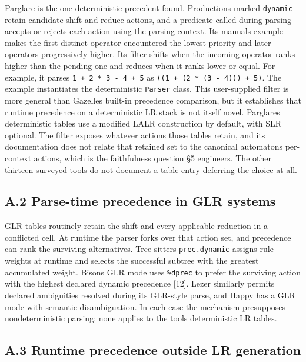 \documentclass[
  10pt,
]{article}
\begin{document}
Parglare is the one deterministic precedent found. Productions marked
\texttt{dynamic} retain candidate shift and reduce actions, and a
predicate called during parsing accepts or rejects each action using the
parsing context. Its manual\textquotesingle s example makes the first
distinct operator encountered the lowest priority and later operators
progressively higher. Its filter shifts when the incoming operator ranks
higher than the pending one and reduces when it ranks lower or equal.
For example, it parses \texttt{1\ +\ 2\ *\ 3\ -\ 4\ +\ 5} as
\texttt{((1\ +\ (2\ *\ (3\ -\ 4)))\ +\ 5)}. The example instantiates the
deterministic \texttt{Parser} class. This user-supplied filter is more
general than Gazelle\textquotesingle s built-in precedence comparison,
but it establishes that runtime precedence on a deterministic LR stack
is not itself novel. Parglare\textquotesingle s deterministic tables use
a modified LALR construction by default, with SLR optional. The filter
exposes whatever actions those tables retain, and its documentation does
not relate that retained set to the canonical
automaton\textquotesingle s per-context actions, which is the
faithfulness question §5 engineers. The other thirteen surveyed tools do
not document a table entry deferring the choice at all.

\hypertarget{a2-parse-time-precedence-in-glr-systems}{%
\subsection{A.2 Parse-time precedence in GLR
systems}\label{a2-parse-time-precedence-in-glr-systems}}

GLR tables routinely retain the shift and every applicable reduction in
a conflicted cell. At runtime the parser forks over that action set, and
precedence can rank the surviving alternatives.
Tree-sitter\textquotesingle s \texttt{prec.dynamic} assigns rule weights
at runtime and selects the successful subtree with the greatest
accumulated weight. Bison\textquotesingle s GLR mode uses
\texttt{\%dprec} to prefer the surviving action with the highest
declared dynamic precedence {[}12{]}. Lezer similarly permits declared
ambiguities resolved during its GLR-style parse, and Happy has a GLR
mode with semantic disambiguation. In each case the mechanism
presupposes nondeterministic parsing; none applies to the
tool\textquotesingle s deterministic LR tables.

\hypertarget{a3-runtime-precedence-outside-lr-generation}{%
\subsection{A.3 Runtime precedence outside LR
generation}\label{a3-runtime-precedence-outside-lr-generation}}
\end{document}
